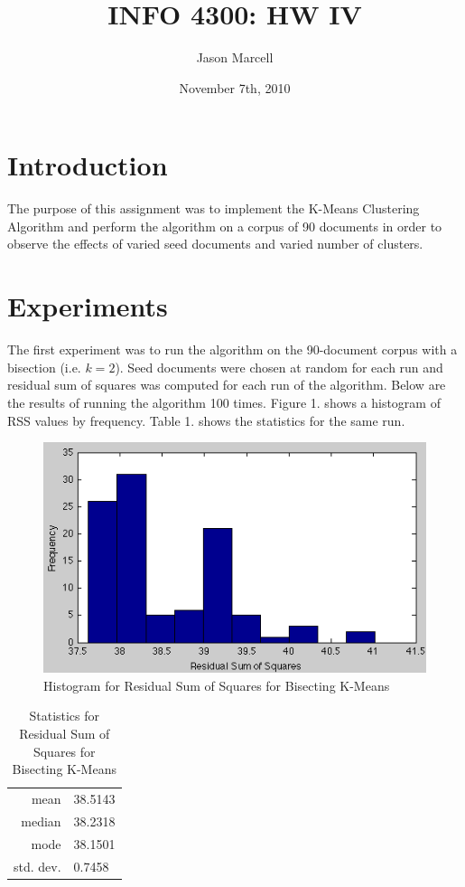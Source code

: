 \documentclass[12pt]{article}
\title{INFO 4300: HW IV}
\author{Jason Marcell}
\date{November 7th, 2010}
\begin{document}
 
\maketitle 
\newpage
\section{Introduction} %
\label{sec:introduction}
The purpose of this assignment was to implement the K-Means Clustering Algorithm and perform the algorithm on a corpus of 90 documents in order to observe the effects of varied seed documents and varied number of clusters.

\section{Experiments} %
\label{sec:experiments}

The first experiment was to run the algorithm on the 90-document corpus with a bisection (i.e. $k = 2$). Seed documents were chosen at random for each run and residual sum of squares was computed for each run of the algorithm. Below are the results of running the algorithm 100 times. Figure 1. shows a histogram of RSS values by frequency. Table 1. shows the statistics for the same run.

\begin{figure}[h!]
  \centering
  \includegraphics[scale=0.6]{histogram.png}
  \caption{Histogram for Residual Sum of Squares for Bisecting K-Means}
\end{figure}

\begin{table}[h!]
  \centering
  \begin{tabular}{r|l}
    mean      &38.5143\\
    median    &38.2318\\
    mode      &38.1501\\
    std. dev. &0.7458
  \end{tabular}
  \caption{Statistics for Residual Sum of Squares for Bisecting K-Means}
\end{table}
\end{document}
